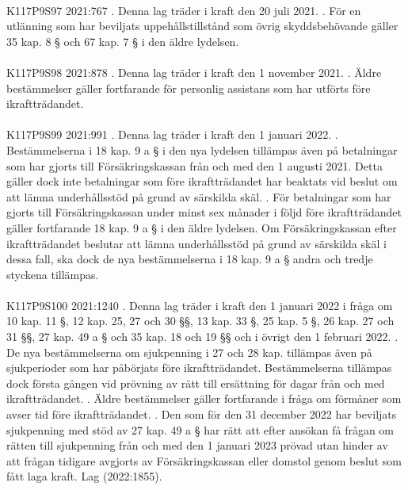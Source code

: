 \documentclass[a4paper,notitlepage,openany,10pt]{book}
\begin{document}
\paragraph*{}
{\tiny K117P9S97}
2021:767
. Denna lag träder i kraft den 20 juli 2021.
. För en utlänning som har beviljats uppehållstillstånd som övrig skyddsbehövande gäller 35 kap. 8 § och 67 kap. 7 § i den äldre lydelsen.
\paragraph*{}
{\tiny K117P9S98}
2021:878
. Denna lag träder i kraft den 1 november 2021.
. Äldre bestämmelser gäller fortfarande för personlig assistans som har utförts före ikraftträdandet.
\paragraph*{}
{\tiny K117P9S99}
2021:991
. Denna lag träder i kraft den 1 januari 2022.
. Bestämmelserna i 18 kap. 9 a § i den nya lydelsen tillämpas även på betalningar som har gjorts till Försäkringskassan från och med den 1 augusti 2021. Detta gäller dock inte betalningar som före ikraftträdandet har beaktats vid beslut om att lämna underhållsstöd på grund av särskilda skäl.
. För betalningar som har gjorts till Försäkringskassan under minst sex månader i följd före ikraftträdandet gäller fortfarande 18 kap. 9 a § i den äldre lydelsen. Om Försäkringskassan efter ikraftträdandet beslutar att lämna underhållsstöd på grund av särskilda skäl i dessa fall, ska dock de nya bestämmelserna i 18 kap. 9 a § andra och tredje styckena tillämpas.
\paragraph*{}
{\tiny K117P9S100}
2021:1240
. Denna lag träder i kraft den 1 januari 2022 i fråga om 10 kap. 11 §, 12 kap. 25, 27 och 30 §§, 13 kap. 33 §, 25 kap. 5 §, 26 kap. 27 och 31 §§, 27 kap. 49 a § och 35 kap. 18 och 19 §§ och i övrigt den 1 februari 2022.
. De nya bestämmelserna om sjukpenning i 27 och 28 kap. tillämpas även på sjukperioder som har påbörjats före ikraftträdandet. Bestämmelserna tillämpas dock första gången vid prövning av rätt till ersättning för dagar från och med ikraftträdandet.
. Äldre bestämmelser gäller fortfarande i fråga om förmåner som avser tid före ikraftträdandet.
. Den som för den 31 december 2022 har beviljats sjukpenning med stöd av 27 kap. 49 a § har rätt att efter ansökan få frågan om rätten till sjukpenning från och med den 1 januari 2023 prövad utan hinder av att frågan tidigare avgjorts av Försäkringskassan eller domstol genom beslut som fått laga kraft.
Lag (2022:1855).
\end{document}
